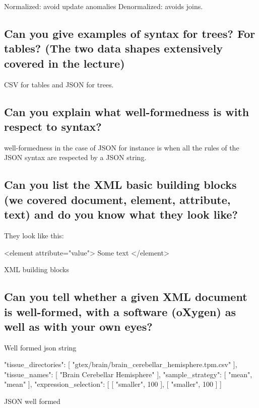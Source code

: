 \documentclass{article}
\begin{document}
Normalized: avoid update anomalies
Denormalized: avoids joins.

\subsection{Can you give examples of syntax for trees? For tables? (The two data shapes extensively covered in the lecture)}

CSV for tables and JSON for trees.


\subsection{Can you explain what well-formedness is with respect to syntax?}

well-formedness in the case of JSON for instance is when all the rules of the JSON syntax are respected by a JSON string.

\subsection{Can you list the XML basic building blocks (we covered document, element, attribute, text) and do you know what they look like?}

They look like this:
\begin{center}
\begin{listing}[!ht]
  \begin{xml}
    <element attribute="value">
    Some text
    </element>
  \end{xml}
  \caption[Test]{XML building blocks}
  \label{lst:test}
\end{listing}
\end{center}


\subsection{Can you tell whether a given XML document is well-formed, with a software (oXygen) as well as with your own eyes?}

Well formed json string

\begin{center}
\begin{listing}[!ht]
  \begin{json}
    {
      "tissue_directories": [
            "gtex/brain/brain_cerebellar_hemisphere.tpm.csv"
      ],
      "tissue_names": [
            "Brain Cerebellar Hemisphere"
      ],
      "sample_strategy": [
            "mean",
            "mean"
      ],
      "expression_selection": [
            [
                  "smaller",
                  100
            ],
            [
                  "smaller",
                  100
            ]
      ]
    }
  \end{json}
  \caption[Test]{JSON well formed}
  \label{lst:test}
\end{listing}
\end{center}
\end{document}
